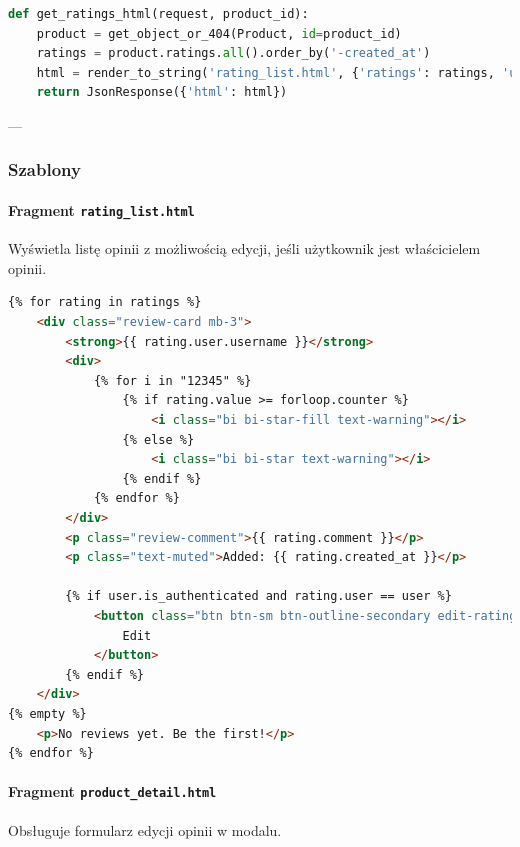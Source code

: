 \documentclass[12pt,a4paper,oneside]{article}
\theoremstyle{definition}
\numberwithin{equation}{section}
\begin{document}
\begin{lstlisting}[language=Python, caption=Widok \texttt{get\_ratings\_html}]
def get_ratings_html(request, product_id):
    product = get_object_or_404(Product, id=product_id)
    ratings = product.ratings.all().order_by('-created_at')
    html = render_to_string('rating_list.html', {'ratings': ratings, 'user': request.user})
    return JsonResponse({'html': html})
\end{lstlisting}

---

\subsubsection{Szablony}

\paragraph{Fragment \texttt{rating\_list.html}}
Wyświetla listę opinii z możliwością edycji, jeśli użytkownik jest właścicielem opinii.

\begin{lstlisting}[language=HTML, caption=Szablon \texttt{rating\_list.html}]
{% for rating in ratings %}
    <div class="review-card mb-3">
        <strong>{{ rating.user.username }}</strong>
        <div>
            {% for i in "12345" %}
                {% if rating.value >= forloop.counter %}
                    <i class="bi bi-star-fill text-warning"></i>
                {% else %}
                    <i class="bi bi-star text-warning"></i>
                {% endif %}
            {% endfor %}
        </div>
        <p class="review-comment">{{ rating.comment }}</p>
        <p class="text-muted">Added: {{ rating.created_at }}</p>

        {% if user.is_authenticated and rating.user == user %}
            <button class="btn btn-sm btn-outline-secondary edit-rating-btn" data-rating-id="{{ rating.id }}">
                Edit
            </button>
        {% endif %}
    </div>
{% empty %}
    <p>No reviews yet. Be the first!</p>
{% endfor %}
\end{lstlisting}

\paragraph{Fragment \texttt{product\_detail.html}}
Obsługuje formularz edycji opinii w modalu.
\end{document}
